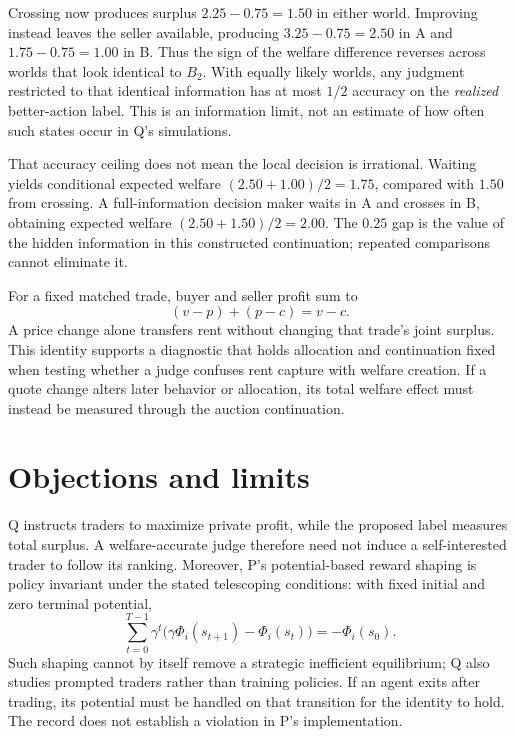 \documentclass{article}
\begin{document}
Crossing now produces surplus \(2.25-0.75=1.50\) in either world. Improving instead leaves the seller available, producing \(3.25-0.75=2.50\) in A and \(1.75-0.75=1.00\) in B. Thus the sign of the welfare difference reverses across worlds that look identical to \(B_2\). With equally likely worlds, any judgment restricted to that identical information has at most \(1/2\) accuracy on the \emph{realized} better-action label. This is an information limit, not an estimate of how often such states occur in Q's simulations. 

That accuracy ceiling does not mean the local decision is irrational. Waiting yields conditional expected welfare \((2.50+1.00)/2=1.75\), compared with \(1.50\) from crossing. A full-information decision maker waits in A and crosses in B, obtaining expected welfare \((2.50+1.50)/2=2.00\). The \(0.25\) gap is the value of the hidden information in this constructed continuation; repeated comparisons cannot eliminate it. 

For a fixed matched trade, buyer and seller profit sum to
\[
(v-p)+(p-c)=v-c.
\]
A price change alone transfers rent without changing that trade's joint surplus. This identity supports a diagnostic that holds allocation and continuation fixed when testing whether a judge confuses rent capture with welfare creation. If a quote change alters later behavior or allocation, its total welfare effect must instead be measured through the auction continuation. 

\section{Objections and limits}

Q instructs traders to maximize private profit, while the proposed label measures total surplus. A welfare-accurate judge therefore need not induce a self-interested trader to follow its ranking. Moreover, P's potential-based reward shaping is policy invariant under the stated telescoping conditions: with fixed initial and zero terminal potential,
\[
\sum_{t=0}^{T-1}\gamma^t
\bigl(\gamma\Phi_i(s_{t+1})-\Phi_i(s_t)\bigr)
=-\Phi_i(s_0).
\]
Such shaping cannot by itself remove a strategic inefficient equilibrium; Q also studies prompted traders rather than training policies. If an agent exits after trading, its potential must be handled on that transition for the identity to hold. The record does not establish a violation in P's implementation. 
\end{document}
